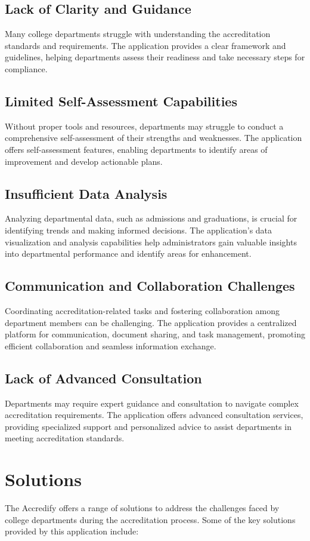 \documentclass[a4paper,11pt]{report}
\begin{document}
\section{Lack of Clarity and Guidance}
Many college departments struggle with understanding the accreditation standards and requirements. The application provides a clear framework and guidelines, helping departments assess their readiness and take necessary steps for compliance.
\section{Limited Self-Assessment Capabilities}
Without proper tools and resources, departments may struggle to conduct a comprehensive self-assessment of their strengths and weaknesses. The application offers self-assessment features, enabling departments to identify areas of improvement and develop actionable plans.
\section{Insufficient Data Analysis}
Analyzing departmental data, such as admissions and graduations, is crucial for identifying trends and making informed decisions. The application's data visualization and analysis capabilities help administrators gain valuable insights into departmental performance and identify areas for enhancement.
\section{Communication and Collaboration Challenges}
Coordinating accreditation-related tasks and fostering collaboration among department members can be challenging. The application provides a centralized platform for communication, document sharing, and task management, promoting efficient collaboration and seamless information exchange.
\section{Lack of Advanced Consultation}
Departments may require expert guidance and consultation to navigate complex accreditation requirements. The application offers advanced consultation services, providing specialized support and personalized advice to assist departments in meeting accreditation standards.

\chapter{Solutions}
The Accredify offers a range of solutions to address the challenges faced by college departments during the accreditation process. Some of the key solutions provided by this application include:
\end{document}
